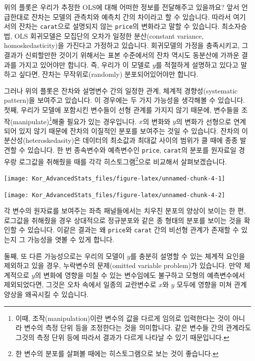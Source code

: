 \documentclass[
]{book}
\begin{document}
위의 플롯은 우리가 추정한 OLS에 대해 어떠한 정보를 전달해주고 있을까요? 앞서 언급한대로 잔차는 모델의 관측치와 예측치 간의 차이라고 할 수 있습니다. 따라서 여기서의 잔차는 \texttt{carat}으로 설명되지 않는 \texttt{price}의 변화라고 말할 수 있습니다. 최소자승법, OLS 회귀모델은 모집단의 오차가 일정한 분산(constant variance, homoskedasticity)을 가진다고 가정하고 있습니다. 회귀모델의 가정을 충족시키고, 그 결과가 신뢰할만한 것이기 위해서는 표본 수준에서의 잔차 역시도 동분산에 가까운 결과를 가지고 있어야만 합니다. 즉, 우리가 이 모델로 \(y\)를 적절하게 설명하고 있다고 말하고 싶다면, 잔차는 무작위로(randomly) 분포되어있어야만 합니다.

그러나 위의 플롯은 잔차와 설명변수 간의 일정한 관계, 체계적 경향성(systematic pattern)을 보여주고 있습니다. 이 경우에는 두 가지 가능성을 생각해볼 수 있습니다. 첫째, 우리가 모델에 포함시킨 변수들이 선형 관계를 가지지 않기 때문에, 변수들을 조작(manipulate)\footnote{이때, 조작(manipulation)이란 변수의 값을 다르게 임의로 입력한다는 것이 아니라 변수의 측정 단위 등을 조정한다는 것을 의미합니다. 같은 변수들 간의 관계라도 그것의 측정 단위 등에 따라서 결과가 다르게 나타날 수 있기 때문입니다.}해줄 필요가 있는 경우입니다. \(x\)의 변화와 \(y\)의 변화가 선형으로 연계되어 있지 않기 때문에 잔차의 이질적인 분포를 보여주는 것일 수 있습니다. 잔차의 이분산성(heteroskedasity)은 데이터의 최소값과 최대값 사이의 범위가 클 때에 종종 발견할 수 있습니다. 한 번 종속변수와 예측변수인 \texttt{price}, \texttt{carat}의 분포를 원자료일 경우랑 로그값을 취해줬을 때를 각각 히스토그램\footnote{한 변수의 분포를 살펴볼 때에는 히스토그램으로 보는 것이 좋습니다.}으로 비교해서 살펴보겠습니다.

\begin{center}\texttt{[image: Kor\_AdvancedStats\_files/figure-latex/unnamed-chunk-4-1]} \end{center}

\begin{center}\texttt{[image: Kor\_AdvancedStats\_files/figure-latex/unnamed-chunk-4-2]} \end{center}

각 변수의 원자료를 보여주는 좌측 패널들에서는 치우친 분포의 양상이 보이는 한 편, 로그값을 취해줬을 경우 상대적으로 정규분포와 같은 종 형태의 분포를 보이는 것을 확인할 수 있습니다. 이같은 결과는 왜 \texttt{price}와 \texttt{carat} 간의 비선형 관계가 존재할 수 있는지 그 가능성을 엿볼 수 있게 합니다.

둘째, 또 다른 가능성으로는 우리의 모델이 \(y\)를 충분히 설명할 수 있는 체계적 요인을 제외하고 있을 경우, 누락변수의 문제(omitted variable problem)가 있습니다. 만약 체계적으로 \(y\)의 변화에 영향을 미칠 수 있는 변수임에도 불구하고 모형의 예측변수에서 제외되었다면, 그것은 오차 속에서 일종의 교란변수로 \(x\)와 \(y\) 모두에 영향을 미쳐 관계 양상을 왜곡시킬 수 있습니다.
\end{document}
